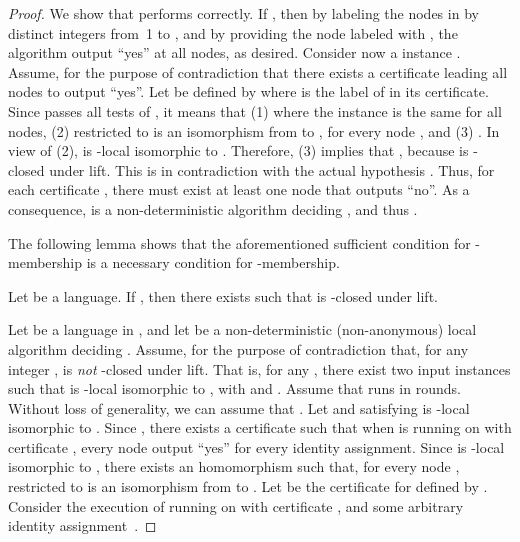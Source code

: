 \documentclass{llncs}
\newenvironment{proofofclaim}{\noindent {\em Proof.}}{\hfill  \medbreak}
\begin{document}
\begin{proof}
\begin{proofofclaim}
We show that  performs correctly. If , then by labeling the nodes in  by distinct integers from~1 to , and by providing the node  labeled  with , the algorithm  output ``yes'' at all nodes, as desired. Consider now a instance . Assume, for the purpose of contradiction that there exists a certificate  leading all nodes to output ``yes''. Let  be defined by  where  is the label of  in its certificate. Since  passes all tests of , it means that (1)  where the instance  is the same for all nodes, (2)  restricted to  is an isomorphism from   to , for every node , and (3)  . In view of (2),  is -local isomorphic to . Therefore, (3) implies that , because  is -closed under lift. This is in contradiction with the actual hypothesis .  Thus, for each certificate , there must exist at least one node that outputs ``no''.  As a consequence,  is a non-deterministic algorithm deciding , and thus .
\end{proofofclaim}

The following lemma shows that the aforementioned sufficient condition for -membership is a necessary condition for -membership. 

\begin{lemma}\label{claim:necessary} 
Let  be a language. If , then there exists  such that  is -closed under lift. 
\end{lemma} 

\begin{proofofclaim}
Let  be a language in , and let  be a non-deterministic (non-anonymous) local algorithm deciding . Assume, for the purpose of contradiction that, for any integer ,  is \emph{not} -closed under lift. That is, for any , there exist two input instances  such that  is -local isomorphic to , with  and . Assume that  runs in  rounds. Without loss of generality, we can assume that .  Let  and  satisfying  is -local isomorphic to . Since , there exists a certificate  such that when  is running on  with certificate , every node output ``yes'' for every identity assignment. Since   is -local isomorphic to , there exists an homomorphism  such that, for every node ,  restricted to  is an isomorphism from   to . Let  be the certificate for  defined by . Consider the execution of  running on  with certificate , and some arbitrary  identity assignment~. 


\end{proofofclaim}
\end{proof}
\end{document}
